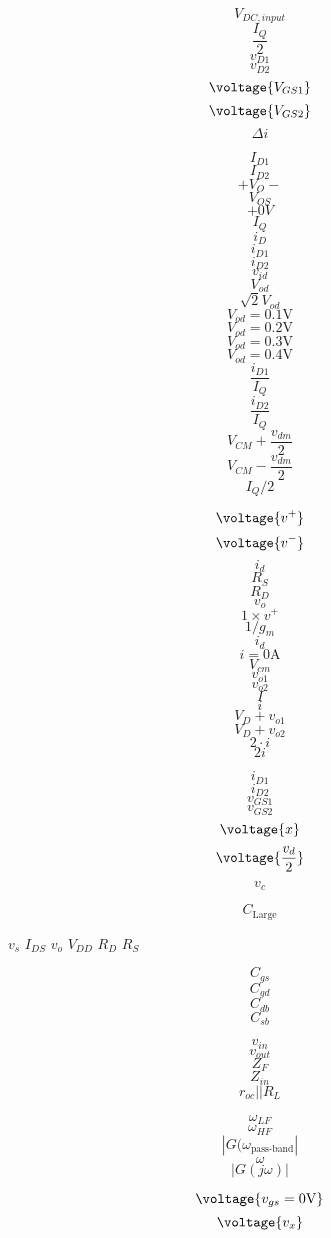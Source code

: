 \documentclass[letterpaper 12pt]{book}
\begin{document}
\[ V_{DC,input} \]
\[ \frac{I_Q}{2} \]
\[ v_{D1} \]
\[ v_{D2} \]
\[ \voltage{V_{GS1}} \]
\[ \voltage{V_{GS2}} \]
\[ \Delta i \]



\[ I_{D1} \]
\[ I_{D2} \]
\[ + V_{O} - \]
\[ V_{OS} \]
\[ + 0V \]
\[ I_Q \]
\[ i_D \]
\[ i_{D1} \]
\[ i_{D2} \]
\[ v_{id} \]
\[ V_{od} \]
\[ \sqrt{2} V_{od} \]
\[ V_{od} = 0.1\mathrm{V} \]
\[ V_{od} = 0.2\mathrm{V} \]
\[ V_{od} = 0.3\mathrm{V} \]
\[ V_{od} = 0.4\mathrm{V} \]
\[ \frac{i_{D1}}{I_Q} \]
\[ \frac{i_{D2}}{I_Q} \]
\[ V_{CM} + \frac{v_{dm}}{2} \]
\[ V_{CM} - \frac{v_{dm}}{2} \]
\[ I_Q/2 \]

\[ \voltage{v^+} \]
\[ \voltage{v^-} \]
\[ i_d \]
\[ R_S \]
\[ R_D \]
\[ v_o \]
\[ 1 \times v^+ \]
\[ 1/g_m \]
\[ i_d \]
\[ i = 0\mathrm{A} \]
\[ V_{cm} \]
\[ v_{o1} \]
\[ v_{o2} \]
\[ I \]
\[ i \]
\[ V_D + v_{o1} \]
\[ V_D + v_{o2} \]
\[ 2 \cdot i \]
\[ 2 i \]


\[ i_{D1} \]
\[ i_{D2} \]
\[ v_{GS1} \]
\[ v_{GS2} \]
\[ \voltage{x} \]
\[ \voltage{\frac{v_d}{2}} \]
\[ v_c \]


\[ C_{\text{Large}} \]

$v_s$
$I_{DS} $
$v_o$ 
$V_{DD}$
$R_D$
$R_S$

\[ C_{gs} \]
\[ C_{gd} \]
\[ C_{db} \]
\[ C_{sb} \]

\[ v_{in} \]
\[ v_{out} \]
\[ Z_F \]
\[ Z_{in} \]
\[ r_{oc} || R_L \]

\[ \omega_{LF} \]
\[ \omega_{HF} \]
\[ |G(\omega_{\text{pass-band}}| \]
\[ \omega \]
\[ |G(j\omega)| \]

\[ \voltage{v_{gs} = 0\mathrm{V}} \]
\[ \voltage{v_x} \]
\end{document}

